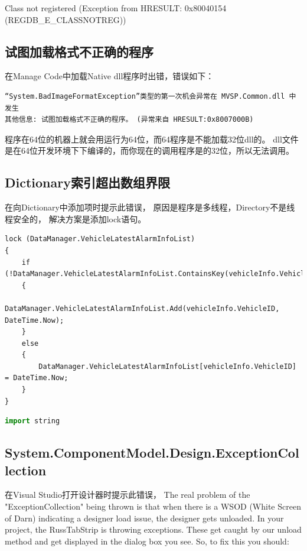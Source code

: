 \documentclass{book}
\begin{document}
Class not registered (Exception from HRESULT: 0x80040154 (REGDB\_E\_CLASSNOTREG))

\subsection{试图加载格式不正确的程序}

在Manage Code中加载Native dll程序时出错，错误如下：

\begin{lstlisting}[language={[Sharp]C}]
“System.BadImageFormatException”类型的第一次机会异常在 MVSP.Common.dll 中发生
其他信息: 试图加载格式不正确的程序。 (异常来自 HRESULT:0x8007000B)
\end{lstlisting}

程序在64位的机器上就会用运行为64位，而64程序是不能加载32位dll的。
dll文件是在64位开发环境下下编译的，而你现在的调用程序是的32位，所以无法调用。

\subsection{Dictionary索引超出数组界限}

在向Dictionary中添加项时提示此错误，
原因是程序是多线程，Directory不是线程安全的，
解决方案是添加lock语句。

\begin{lstlisting}[language={[Sharp]C}]
lock (DataManager.VehicleLatestAlarmInfoList)
{
	if (!DataManager.VehicleLatestAlarmInfoList.ContainsKey(vehicleInfo.VehicleID))
	{
		DataManager.VehicleLatestAlarmInfoList.Add(vehicleInfo.VehicleID, DateTime.Now);
	}
	else
	{
		DataManager.VehicleLatestAlarmInfoList[vehicleInfo.VehicleID] = DateTime.Now;
	}
}
\end{lstlisting}

\begin{lstlisting}[language=Python]
import string
\end{lstlisting}

\subsection{System.ComponentModel.Design.ExceptionCollection}

在Visual Studio打开设计器时提示此错误，
The real problem of the "ExceptionCollection" being thrown is that when there is a WSOD (White Screen of Darn) indicating a designer load issue, 
the designer gets unloaded. In your project, the RussTabStrip is throwing exceptions. 
These get caught by our unload method and get displayed in the dialog box you see.
So, to fix this you should:
\end{document}
